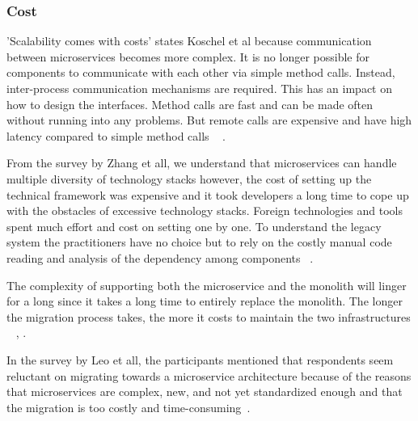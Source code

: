\subsubsection{Cost}%
'Scalability comes with costs' states Koschel et al because communication between microservices becomes more complex. It is no longer possible for components to communicate with each other via simple method calls. Instead, inter-process communication mechanisms are required. This has an impact on how to design the interfaces. Method calls are fast and can be made often without running into any problems. But remote calls are expensive and have high latency compared to simple method calls ~\cite{Koschel2017} \cite{McElhiney2018}. 

From the survey by Zhang et all, we understand that microservices can handle multiple diversity of technology stacks however, the cost of setting up the technical framework was expensive and it took developers a long time to cope up with the obstacles of excessive technology stacks. Foreign technologies and tools spent much effort and cost on setting one by one. To understand the legacy system the practitioners have no choice but to rely on the costly manual code reading and analysis of the dependency among components ~\cite{Zhang2019}. 

The complexity of supporting both the microservice and the monolith will linger for a long since it takes a long time to entirely replace the monolith. The longer the migration process takes, the more it costs to maintain the two infrastructures ~\cite{Ndungu2019} \cite{Meshenberg2016}, \cite{Michael2018}.

In the survey by Leo et all, the participants mentioned that respondents seem reluctant on migrating towards a microservice architecture because of the reasons that microservices are complex, new, and not yet standardized enough and that the migration is too costly and time-consuming~\cite{Leo2019}.



